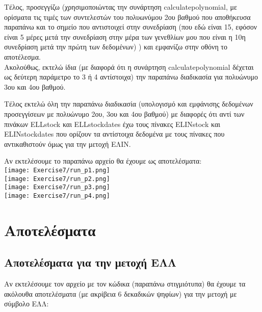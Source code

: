 \documentclass[a4paper,11pt]{article}
\newcommand{\lt}{\latintext}
\begin{document}
Τέλος, προσεγγίζω (χρησιμοποιώντας την συνάρτηση {\lt calculate\textunderscore polynomial}, με ορίσματα τις τιμές των συντελεστών του πολυωνύμου 2ου βαθμού που αποθήκευσα παραπάνω και το σημείο που αντιστοιχεί στην συνεδρίαση (που εδώ είναι 15, εφόσον είναι 5 μέρες μετά την συνεδρίαση στην μέρα των γενεθλίων μου που είναι η 10η συνεδρίαση μετά την πρώτη των δεδομένων) ) και εμφανίζω στην οθόνη το αποτέλεσμα.\\

Ακολούθως, εκτελώ ίδια (με διαφορά ότι η συνάρτηση {\lt calculate\textunderscore polynomial} δέχεται ως δεύτερη παράμετρο το 3 ή 4 αντίστοιχα) την παραπάνω διαδικασία για πολυώνυμο 3ου και 4ου βαθμού.\\

\par
Τέλος εκτελώ όλη την παραπάνω διαδικασία (υπολογισμό και εμφάνισης δεδομένων προσεγγίσεων με πολυώνυμο 2ου, 3ου και 4ου βαθμού) με διαφορές ότι αντί των πινάκων {\lt ELL\textunderscore stock} και {\lt ELL\textunderscore stock\textunderscore dates} έχω τους πίνακες {\lt ELIN\textunderscore stock} και {\lt ELIN\textunderscore stock\textunderscore dates} που ορίζουν τα αντίστοιχα δεδομένα με τους πίνακες που αντικαθιστούν όμως για την μετοχή ΕΛΙΝ.\\

\par
Αν εκτελέσουμε το παραπάνω αρχείο θα έχουμε ως αποτελέσματα:\\
\texttt{[image: Exercise7/run\_p1.png]}\\
\texttt{[image: Exercise7/run\_p2.png]}\\
\texttt{[image: Exercise7/run\_p3.png]}\\
\texttt{[image: Exercise7/run\_p4.png]}\\

\section{Αποτελέσματα}

\subsection{Αποτελέσματα για την μετοχή ΕΛΛ}
Αν εκτελέσουμε τον αρχείο με τον κώδικα (παραπάνω στιγμιότυπα) θα έχουμε τα ακόλουθα αποτελέσματα (με ακρίβεια 6 δεκαδικών ψηφίων) για την μετοχή με σύμβολο ΕΛΛ:\\
\end{document}
